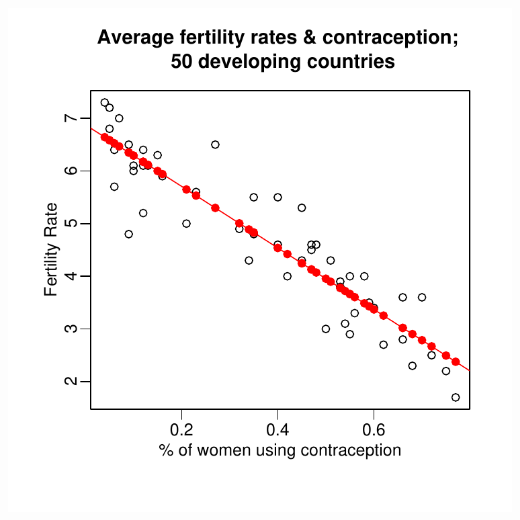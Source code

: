 \documentclass[pdflatex,landscape,titlepage]{foils}
\begin{document}
\begin{center}

\includegraphics[width=6.7 in]{predictedfert1}

\end{center}
\end{document}
